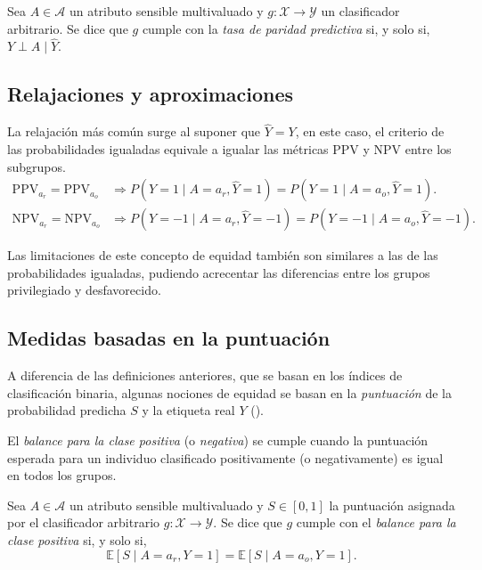 \documentclass[oneside,openright,titlepage,numbers=noenddot,openany,headinclude,footinclude=true,
cleardoublepage=empty,abstractoff,BCOR=5mm,paper=a4,fontsize=12pt,main=spanish]{scrreprt}
\begin{document}
\begin{definition}
Sea $A \in \mathcal{A}$ un atributo sensible multivaluado y $g\colon \mathcal{X} \to \mathcal{Y}$ un clasificador arbitrario. Se dice que $g$ cumple con la \textit{tasa de paridad predictiva} si, y solo si, $Y \perp A \mid \hat{Y}$.
\end{definition}

\subsection*{Relajaciones y aproximaciones}

La relajación más común surge al suponer que $\hat{Y}=Y$, en este caso, el criterio de las probabilidades igualadas equivale a igualar las métricas PPV y NPV entre los subgrupos. 
\begin{equation*}
\begin{split}
\text{PPV}_{a_r}=\text{PPV}_{a_o} &\Rightarrow P(Y=1 \mid A=a_r, \hat{Y}=1)=P(Y=1 \mid A=a_o, \hat{Y}=1).\\
\text{NPV}_{a_r}=\text{NPV}_{a_o} &\Rightarrow P(Y=-1 \mid A=a_r,\hat{Y}=-1)=P(Y=-1 \mid A=a_o,\hat{Y}=-1).
\end{split}
\end{equation*}

Las limitaciones de este concepto de equidad también son similares a las de las probabilidades igualadas, pudiendo acrecentar las diferencias entre los grupos privilegiado y desfavorecido.

\subsection{Medidas basadas en la puntuación}

A diferencia de las definiciones anteriores, que se basan en los índices de clasificación binaria, algunas nociones de equidad se basan en la \textit{puntuación} de la probabilidad predicha $S$ y la etiqueta real $Y$ (\cite{catalogue2018}).

El \textit{balance para la clase positiva} (o \textit{negativa}) se cumple cuando la puntuación esperada para un individuo clasificado positivamente (o negativamente) es igual en todos los grupos.\\

\begin{definition}
Sea $A \in \mathcal{A}$ un atributo sensible multivaluado y $S\in [0,1]$ la puntuación asignada por el clasificador arbitrario $g\colon \mathcal{X} \to \mathcal{Y}$. Se dice que $g$ cumple con el \textit{balance para la clase positiva} si, y solo si, $$\mathbb{E}[S \mid A=a_r,Y=1]=\mathbb{E}[S \mid A=a_o,Y=1].$$
\end{definition}\
\end{document}
